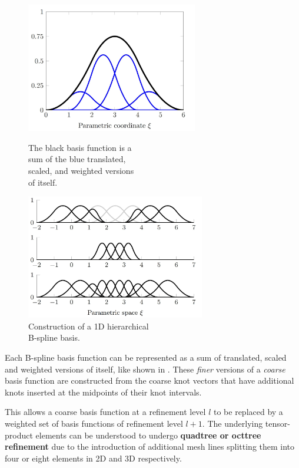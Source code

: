 \begin{figure}[H]
    \centering
    \begin{minipage}{0.5\textwidth}
        \centering
        \includegraphics[width = 7.5cm]{Figures/truncation.jpg}
        \caption{The black basis function is a \\ sum of the blue translated, \\ scaled, and weighted versions \\ of itself. }
        \label{fig:truncation}
    \end{minipage}%
    \begin{minipage}{0.5\textwidth}
        \centering
        \includegraphics[width = 7.8cm]{Figures/thb_basis.jpg}
        \caption{Construction of a 1D hierarchical \\ B-spline basis. }
        \label{fig:thb_basis}
    \end{minipage}
\end{figure}

Each B-spline basis function can be represented as a sum of translated, scaled and weighted versions of itself, like shown in . These \emph{finer} versions of a \emph{coarse} basis function are constructed from the coarse knot vectors that have additional knots inserted at the midpoints of their knot intervals.

This allows a coarse basis function at a refinement level $l$ to be replaced by a weighted set of basis functions of refinement level $l+1$. The underlying tensor-product elements can be understood to undergo \textbf{quadtree or octtree refinement} due to the introduction of additional mesh lines splitting them into four or eight elements in 2D and 3D respectively.


